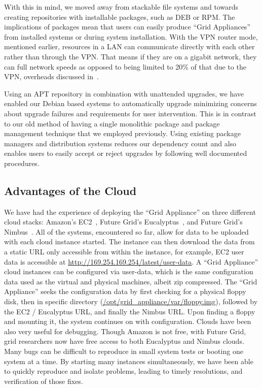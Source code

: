 \documentclass[twocolumn]{svjour3}
\begin{document}
With this in mind, we moved away from stackable file systems and towards
creating repositories with installable packages, such as DEB or RPM.  The
implications of packages mean that users can easily produce ``Grid Appliances''
from installed systems or during system installation.  With the VPN router
mode, mentioned earlier, resources in a LAN can communicate directly with each
other rather than through the VPN.  That means if they are on a gigabit
network, they can full network speeds as opposed to being limited to 20\% of
that due to the VPN, overheads discussed in~\cite{sc09}.

Using an APT repository in combination with unattended upgrades, we have
enabled our Debian based systems to automatically upgrade minimizing concerns
about upgrade failures and requirements for user intervention.  This is in
contrast to our old method of having a single monolithic package and package
management technique that we employed previously.  Using existing package
managers and distribution systems reduces our dependency count and also enables
users to easily accept or reject upgrades by following well documented
procedures.

\subsection{Advantages of the Cloud}

We have had the experience of deploying the ``Grid Appliance'' on three
different cloud stacks:  Amazon's EC2~\cite{ec2}, Future Grid's
Eucalyptus~\cite{eucalyptus}, and Future Grid's Nimbus~\cite{nimbus}.  All of
the systems, encountered so far, allow for data to be uploaded with each cloud
instance started.  The instance can then download the data from a static URL
only accessible from within the instance, for example, EC2 user data is
accessible at \url{http://169.254.169.254/latest/user-data}. A ``Grid
Appliance'' cloud instances can be configured via user-data, which is the same
configuration data used as the virtual and physical machines, albeit zip
compressed.  The ``Grid Appliance'' seeks the configuration data by first
checking for a physical floppy disk, then in specific directory
(\url{/opt/grid_appliance/var/floppy.img}), followed by the EC2 / Eucalyptus
URL, and finally the Nimbus URL.  Upon finding a floppy and mounting it, the
system continues on with configuration.  Clouds have been also very useful for
debugging.  Though Amazon is not free, with Future Grid, grid researchers now
have free access to both Eucalyptus and Nimbus clouds.  Many bugs can be
difficult to reproduce in small system tests or booting one system at a time.
By starting many instances simultaneously, we have been able to quickly
reproduce and isolate problems, leading to timely resolutions, and verification
of those fixes.
\end{document}
